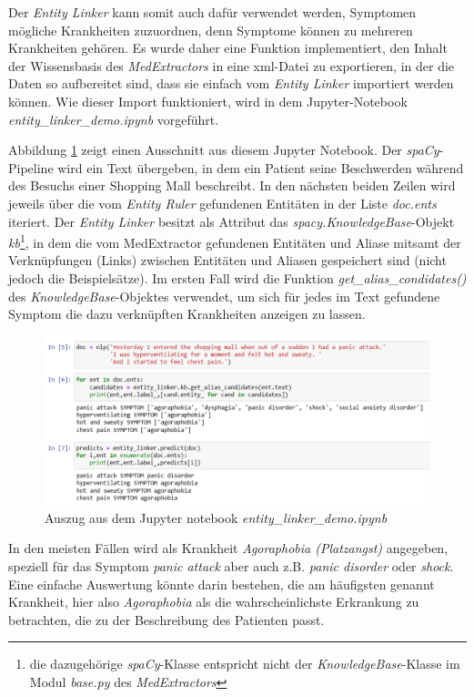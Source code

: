 Der \emph{Entity Linker} kann somit auch dafür verwendet werden, Symptomen mögliche Krankheiten zuzuordnen, denn Symptome können zu mehreren Krankheiten gehören. Es wurde daher eine Funktion implementiert, den Inhalt der Wissensbasis des \emph{MedExtractors} in eine xml-Datei zu exportieren, in der die Daten so aufbereitet sind, dass sie einfach vom \emph{Entity Linker} importiert werden können. Wie dieser Import funktioniert, wird in dem Jupyter-Notebook \emph{entity\_linker\_demo.ipynb} vorgeführt.

Abbildung \ref{fig:jupyter} zeigt einen Ausschnitt aus diesem Jupyter Notebook. Der \emph{spaCy}-Pipeline wird ein Text übergeben, in dem ein Patient seine Beschwerden während des Besuchs einer Shopping Mall beschreibt. In den nächsten beiden Zeilen wird jeweils über die vom \emph{Entity Ruler} gefundenen Entitäten in der Liste \emph{doc.ents} iteriert. Der \emph{Entity Linker} besitzt als Attribut das \emph{spacy.KnowledgeBase}-Objekt \emph{kb}\footnote{die dazugehörige \emph{spaCy}-Klasse entspricht nicht der \emph{KnowledgeBase}-Klasse im Modul \emph{base.py} des \emph{MedExtractors}}, in dem die vom MedExtractor gefundenen Entitäten und Aliase mitsamt der Verknüpfungen (Links) zwischen Entitäten und Aliasen gespeichert sind (nicht jedoch die Beispielsätze). Im ersten Fall wird die Funktion \emph{get\_alias\_condidates()} des \emph{KnowledgeBase}-Objektes verwendet, um sich für jedes im Text gefundene Symptom die dazu verknüpften Krankheiten anzeigen zu lassen.

\begin{figure}[h]
    \centering
    \includegraphics[width=\textwidth]{pictures/EntityLinkerDemo.png}
    \caption{Auszug aus dem Jupyter notebook \emph{entity\_linker\_demo.ipynb}}
    \label{fig:jupyter}
\end{figure}

In den meisten Fällen wird als Krankheit \emph{Agoraphobia (Platzangst)} angegeben, speziell für das Symptom \emph{panic attack} aber auch z.B. \emph{panic disorder} oder \emph{shock}. Eine einfache Auswertung könnte darin bestehen, die am häufigsten genannt Krankheit, hier also \emph{Agoraphobia} als die wahrscheinlichste Erkrankung zu betrachten, die zu der Beschreibung des Patienten passt.

